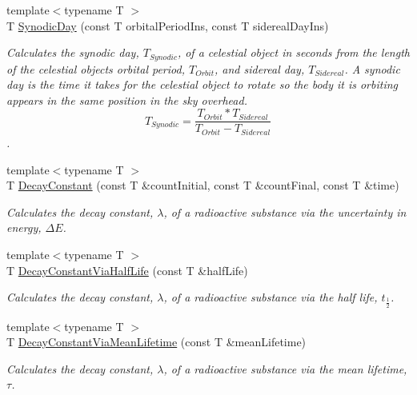 \begin{DoxyCompactItemize}
{\footnotesize template$<$typename T $>$ }\\T \mbox{\hyperlink{group___e_g_x_phys-_astrophysic-_synodic_day_ga637140842bc008c87d90e65b551cbac7}{Synodic\+Day}} (const T orbital\+Period\+Ins, const T sidereal\+Day\+Ins)
\begin{DoxyCompactList}\small\item\em Calculates the synodic day, $T_{Synodic}$, of a celestial object in seconds from the length of the celestial object\textquotesingle{}s orbital period, $T_{Orbit}$, and sidereal day, $T_{Sidereal}$. A synodic day is the time it takes for the celestial object to rotate so the body it is orbiting appears in the same position in the sky overhead. \[ T_{Synodic}=\dfrac{T_{Orbit} * T_{Sidereal}}{T_{Orbit} - T_{Sidereal}}\]. \end{DoxyCompactList}\item 
{\footnotesize template$<$typename T $>$ }\\T \mbox{\hyperlink{group___e_g_x_phys-_decay_constant_ga904edce5aad441b4a0873b3b1a83c7f2}{Decay\+Constant}} (const T \&count\+Initial, const T \&count\+Final, const T \&time)
\begin{DoxyCompactList}\small\item\em Calculates the decay constant, $\lambda$, of a radioactive substance via the uncertainty in energy, $\Delta E$. \end{DoxyCompactList}\item 
{\footnotesize template$<$typename T $>$ }\\T \mbox{\hyperlink{group___e_g_x_phys-_decay_constant_ga89c04a655d9e24f976399cc8f173b7aa}{Decay\+Constant\+Via\+Half\+Life}} (const T \&half\+Life)
\begin{DoxyCompactList}\small\item\em Calculates the decay constant, $\lambda$, of a radioactive substance via the half life, $t_{\frac{1}{2}}$. \end{DoxyCompactList}\item 
{\footnotesize template$<$typename T $>$ }\\T \mbox{\hyperlink{group___e_g_x_phys-_decay_constant_ga260cf6dc4f926269ea8966c19dfd269f}{Decay\+Constant\+Via\+Mean\+Lifetime}} (const T \&mean\+Lifetime)
\begin{DoxyCompactList}\small\item\em Calculates the decay constant, $\lambda$, of a radioactive substance via the mean lifetime, $\tau$. \end{DoxyCompactList}\item 

\end{DoxyCompactItemize}

